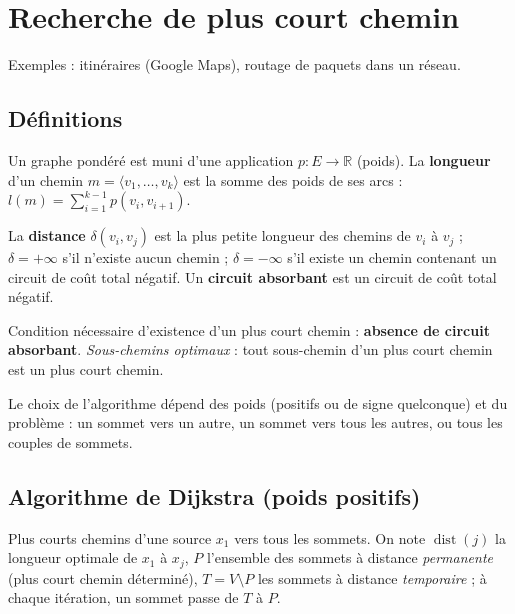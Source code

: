 \documentclass[11pt,a4paper]{article}
\newcommand{\R}{\mathbb{R}}
\newcommand{\dist}{\operatorname{dist}}
\begin{document}
\section{Recherche de plus court chemin}
Exemples : itinéraires (Google Maps), routage de paquets dans un réseau.

\subsection{Définitions}
\begin{definition}
Un graphe pondéré est muni d'une application $p:E\to\R$ (poids). La \textbf{longueur} d'un chemin $m=\langle v_1,\dots,v_k\rangle$ est la somme des poids de ses arcs : $\displaystyle l(m)=\sum_{i=1}^{k-1}p(v_i,v_{i+1})$.
\end{definition}

\begin{definition}
La \textbf{distance} $\delta(v_i,v_j)$ est la plus petite longueur des chemins de $v_i$ à $v_j$ ; $\delta=+\infty$ s'il n'existe aucun chemin ; $\delta=-\infty$ s'il existe un chemin contenant un circuit de coût total négatif. Un \textbf{circuit absorbant} est un circuit de coût total négatif.
\end{definition}

\begin{retenir}
Condition nécessaire d'existence d'un plus court chemin : \textbf{absence de circuit absorbant}. \emph{Sous-chemins optimaux} : tout sous-chemin d'un plus court chemin est un plus court chemin.
\end{retenir}

Le choix de l'algorithme dépend des poids (positifs ou de signe quelconque) et du problème : un sommet vers un autre, un sommet vers tous les autres, ou tous les couples de sommets.

\subsection{Algorithme de Dijkstra (poids positifs)}
Plus courts chemins d'une source $x_1$ vers tous les sommets. On note $\dist(j)$ la longueur optimale de $x_1$ à $x_j$, $P$ l'ensemble des sommets à distance \emph{permanente} (plus court chemin déterminé), $T=V\setminus P$ les sommets à distance \emph{temporaire} ; à chaque itération, un sommet passe de $T$ à $P$.
\end{document}
